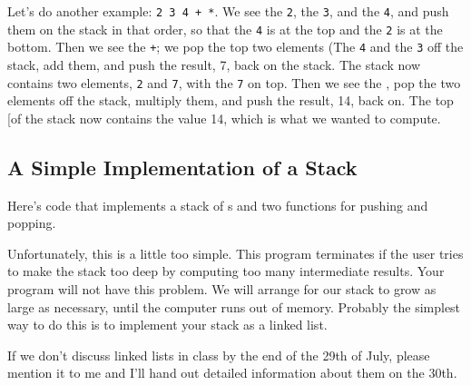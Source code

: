 Let's do another example:  {\tt 2 3 4 + *}.  We see the {\tt 2}, the
{\tt 3}, and the {\tt 4}, and push them on the stack in that order, so
that the {\tt 4} is at the top and the {\tt 2} is at the bottom.  Then
we see the {\tt +}; we pop the top two elements (The {\tt 4} and the
{\tt 3} off the stack, add them, and push the result, 7, back on the
stack.  The stack now contains two elements, {\tt 2} and {\tt 7}, with
the {\tt 7} on top.  Then we see the {\tt *}, pop the two elements off
the stack, multiply them, and push the result, 14, back on.  The top [of
the stack now contains the value 14, which is what we wanted to compute.

\subsection{A Simple Implementation of a Stack}

Here's code that implements a stack of \int s and two functions for
pushing and popping.



Unfortunately, this is a little too simple.  This program terminates if
the user tries to make the stack too deep by computing too many
intermediate results.  Your program will not have this problem.  We will
arrange for our stack to grow as large as necessary, until the computer
runs out of memory.  Probably the simplest way to do this is to
implement your stack as a linked list.

If we don't discuss linked lists in class by the end of the 29th of
July, please mention it to me and I'll hand out detailed information
about them on the 30th.  




